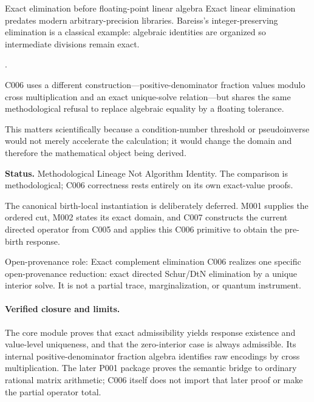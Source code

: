 \begin{cnnaInfoBox}{Exact elimination before floating-point linear algebra}
\label{box:c006-exact-elimination-infobox}
Exact linear elimination predates modern arbitrary-precision libraries.  Bareiss's integer-preserving elimination is a classical example: algebraic identities are organized so intermediate divisions remain exact.

\cite[pp.~565--578]{Bareiss1968ExactElimination}.

C006 uses a different construction---positive-denominator fraction values modulo cross multiplication and an exact unique-solve relation---but shares the same methodological refusal to replace algebraic equality by a floating tolerance.

This matters scientifically because a condition-number threshold or pseudoinverse would not merely accelerate the calculation; it would change the domain and therefore the mathematical object being derived.

\textbf{Status.} Methodological Lineage Not Algorithm Identity. The comparison is methodological; C006 correctness rests entirely on its own exact-value proofs.
\end{cnnaInfoBox}


The canonical birth-local instantiation is deliberately deferred.  M001
supplies the ordered cut, M002 states its exact domain, and C007
constructs the current directed operator from C005 and applies this C006
primitive to obtain the pre-birth response.

\begin{cnnaInfoBox}{Open-provenance role: Exact complement elimination}
C006 realizes one specific open-provenance reduction: exact directed Schur/DtN elimination by a unique interior solve.  It is not a partial trace, marginalization, or quantum instrument.
\end{cnnaInfoBox}

\paragraph*{Verified closure and limits.}
The core module proves that exact admissibility yields response existence and
value-level uniqueness, and that the zero-interior case is always admissible.
Its internal positive-denominator fraction algebra identifies raw encodings by
cross multiplication.  The later P001 package proves the semantic bridge to
ordinary rational matrix arithmetic; C006 itself does not import that later
proof or make the partial operator total.
